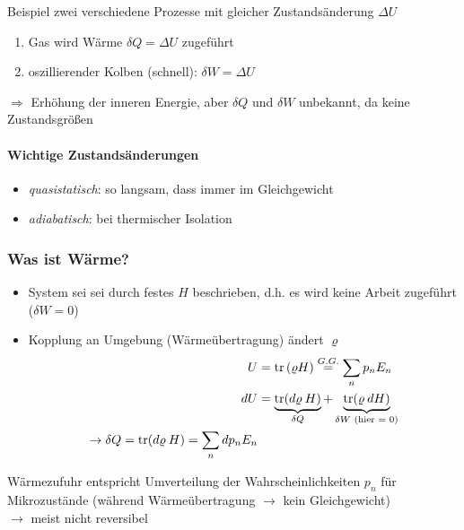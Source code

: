 \begin{beispiel}{Beispiel}
    zwei verschiedene Prozesse mit gleicher Zustandsänderung $\Delta U$
    \begin{enumerate}
        \item Gas wird Wärme $\delta Q = \Delta U$ zugeführt
        \item oszillierender Kolben (schnell): $\delta W = \Delta U$
    \end{enumerate}
    $\Rightarrow$ Erhöhung der inneren Energie, aber $\delta Q$ und $\delta W$ unbekannt, da keine Zustandsgrößen
\end{beispiel}

\paragraph{Wichtige Zustandsänderungen}
\begin{itemize}
    \item \emph{quasistatisch}: so langsam, dass immer im Gleichgewicht
    \item \emph{adiabatisch}: bei thermischer Isolation
\end{itemize}

\subsubsection{Was ist Wärme?}
\begin{itemize}
    \item System sei sei durch festes $H$ beschrieben, d.h. es wird keine Arbeit zugeführt ($\delta W = 0$)
    \item Kopplung an Umgebung (Wärmeübertragung) ändert $\varrho$
    \begin{align}
        U &= \trace\left(\varrho H\right) \stackrel{G.G.}{=} \sum_n p_n E_n \\
        dU &= \underbrace{\trace(d\varrho \: H)}_{\delta Q} + \underbrace{\trace(\varrho \: dH)}_{\delta W \text{ (hier = 0)}} \\
        \rightarrow \delta Q = \trace(d\varrho \: H) = \sum_n dp_n E_n
    \end{align}
\end{itemize}

Wärmezufuhr entspricht Umverteilung der Wahrscheinlichkeiten $p_n$ für Mikrozustände (während Wärmeübertragung $\rightarrow$ kein Gleichgewicht)\\
$\longrightarrow$ meist nicht reversibel


